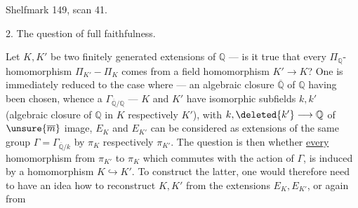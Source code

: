 Shelfmark 149, scan 41.

2. The question of full faithfulness.

Let $K,K'$ be two finitely generated extensions of $\mathbb Q$ --- is it true that every $\Pi_{\mathbb Q}$-homomorphism $\Pi_{K'}-\Pi_K$ comes from a field homomorphism $K'\longrightarrow K$? One is immediately reduced to the case where --- an algebraic closure $\overline{\mathbb Q}$ of $\mathbb Q$ having been chosen, whence a $\Gamma_{\overline{\mathbb Q}/\mathbb Q}$ --- $K$ and $K'$ have isomorphic subfields $k,k'$ (algebraic closure of $\mathbb Q$ in $K$ respectively $K'$), with   $k,\deleted{k'}\longrightarrow\mathbb Q$ of $\unsure{\overline m}$ image,  $E_K$ and $E_{K'}$ can be considered as extensions of the same group $\Gamma=\Gamma_{\overline{\mathbb Q}/k}$ by $\pi_K$ respectively $\pi_{K'}$. The question is then whether \uline{every} homomorphism from $\pi_{K'}$ to $\pi_K$ which commutes with the action of $\Gamma$, is induced by a homomorphism $K\hookrightarrow K'$. To construct the latter, one would therefore need to have an idea how to reconstruct $K,K'$ from the extensions $E_K,E_{K'}$, or again from
